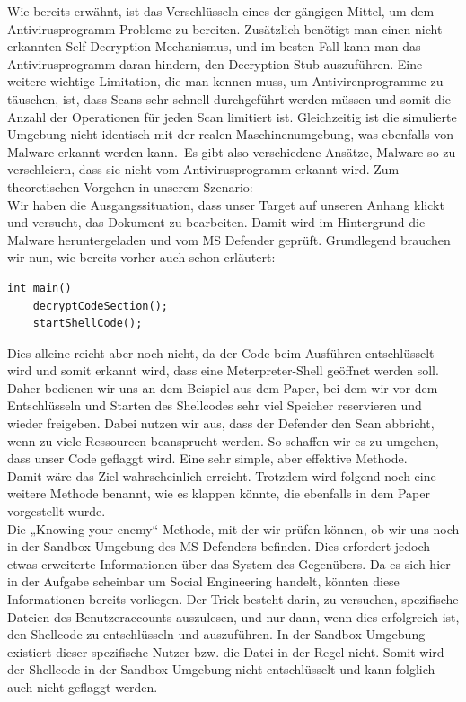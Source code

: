 Wie bereits erwähnt, ist das Verschlüsseln eines der gängigen Mittel, um dem Antivirusprogramm Probleme zu bereiten. Zusätzlich benötigt man einen nicht erkannten Self-Decryption-Mechanismus, und im besten Fall kann man das Antivirusprogramm daran hindern, den Decryption Stub auszuführen. Eine weitere wichtige Limitation, die man kennen muss, um Antivirenprogramme zu täuschen, ist, dass Scans sehr schnell durchgeführt werden müssen und somit die Anzahl der Operationen für jeden Scan limitiert ist. Gleichzeitig ist die simulierte Umgebung nicht identisch mit der realen Maschinenumgebung, was ebenfalls von Malware erkannt werden kann.\
Es gibt also verschiedene Ansätze, Malware so zu verschleiern, dass sie nicht vom Antivirusprogramm erkannt wird. Zum theoretischen Vorgehen in unserem Szenario:\\
Wir haben die Ausgangssituation, dass unser Target auf unseren Anhang klickt und versucht, das Dokument zu bearbeiten. Damit wird im Hintergrund die Malware heruntergeladen und vom MS Defender geprüft. Grundlegend brauchen wir nun, wie bereits vorher auch schon erläutert:
\begin{lstlisting}[caption={Grundbaustein}]
	int main()
	decryptCodeSection();
	startShellCode();
\end{lstlisting}
Dies alleine reicht aber noch nicht, da der Code beim Ausführen entschlüsselt wird und somit erkannt wird, dass eine Meterpreter-Shell geöffnet werden soll.\\
Daher bedienen wir uns an dem Beispiel aus dem Paper, bei dem wir vor dem Entschlüsseln und Starten des Shellcodes sehr viel Speicher reservieren und wieder freigeben. Dabei nutzen wir aus, dass der Defender den Scan abbricht, wenn zu viele Ressourcen beansprucht werden. So schaffen wir es zu umgehen, dass unser Code geflaggt wird. Eine sehr simple, aber effektive Methode.\\
Damit wäre das Ziel wahrscheinlich erreicht. Trotzdem wird folgend noch eine weitere Methode benannt, wie es klappen könnte, die ebenfalls in dem Paper vorgestellt wurde.\\
Die „Knowing your enemy“-Methode, mit der wir prüfen können, ob wir uns noch in der Sandbox-Umgebung des MS Defenders befinden. Dies erfordert jedoch etwas erweiterte Informationen über das System des Gegenübers. Da es sich hier in der Aufgabe scheinbar um Social Engineering handelt, könnten diese Informationen bereits vorliegen. Der Trick besteht darin, zu versuchen, spezifische Dateien des Benutzeraccounts auszulesen, und nur dann, wenn dies erfolgreich ist, den Shellcode zu entschlüsseln und auszuführen. In der Sandbox-Umgebung existiert dieser spezifische Nutzer bzw. die Datei in der Regel nicht. Somit wird der Shellcode in der Sandbox-Umgebung nicht entschlüsselt und kann folglich auch nicht geflaggt werden.